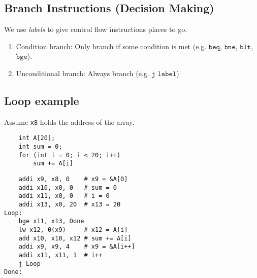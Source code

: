 \subsection{Branch Instructions (Decision Making)}
We use \emph{labels} to give control flow instructions places to go.
\begin{enumerate}
    \item Condition branch: Only branch if some condition is met (e.g. $\texttt{beq}$, $\texttt{bne}$, $\texttt{blt}$, $\texttt{bge}$).
    \item Unconditional branch: Always branch (e.g. $\texttt{j label}$)
\end{enumerate}

\subsection{Loop example}
Assume \texttt{x8} holds the address of the array.
\begin{multicols}{2}
	\begin{verbatim}
    int A[20];
    int sum = 0;
    for (int i = 0; i < 20; i++)
    	sum += A[i]
	\end{verbatim}
	
	\columnbreak
	
	\begin{verbatim}
	addi x9, x8, 0    # x9 = &A[0]
	addi x10, x0, 0   # sum = 0
	addi x11, x0, 0   # i = 0
	addi x13, x0, 20  # x13 = 20
Loop:
    bge x11, x13, Done
	lw x12, 0(x9)     # x12 = A[i]
	add x10, x10, x12 # sum += A[i]
	addi x9, x9, 4    # x9 = &A[i++]
	addi x11, x11, 1  # i++
	j Loop
Done:
	\end{verbatim}
\end{multicols}
